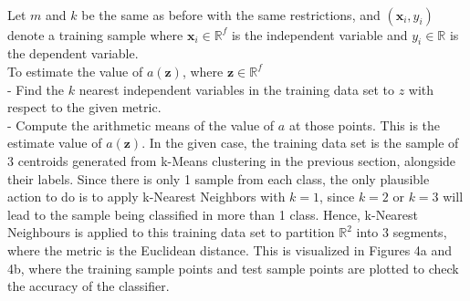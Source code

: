                                             \\
                                            Let $m$ and $k$ be the same as before with the same restrictions, and $(\bm{x}_i, y_i)$ denote a training sample where $\bm{x}_i \in \mathbb{R}^f$ is the independent variable and $y_i \in \mathbb{R}$ is the dependent variable.
                                            \\
                                            To estimate the value of $a(\bm{z})$, where $\bm{z} \in \mathbb{R}^f$ 
                                            \\
                                            - Find the $k$ nearest independent variables in the training data set to $z$ with respect to the given metric.
                                            \\
                                            - Compute the arithmetic means of the value of $a$ at those points. This is the estimate value of $a(\bm{z})$.
In the given case, the training data set is the sample of 3 centroids generated from k-Means clustering in the previous section, alongside their labels. Since there is only 1 sample from each class, the only plausible action to do is to apply k-Nearest Neighbors with $k=1$, since $k=2$ or $k=3$ will lead to the sample being classified in more than 1 class. Hence, k-Nearest Neighbours is applied to this training data set to partition $\mathbb{R}^2$ into 3 segments, where the metric is the
Euclidean distance. This is visualized in Figures 4a and 4b, where the training sample points and test sample points are plotted to check the accuracy of the classifier.


